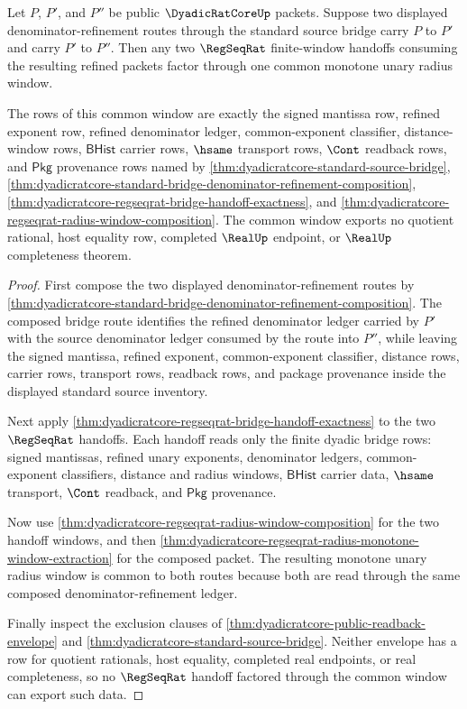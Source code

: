 \begin{theorem}
\label{thm:dyadicratcore-directed-refinement-common-window}
Let $P$, $P'$, and $P''$ be public $\DyadicRatCoreUp$ packets. Suppose two displayed denominator-refinement routes through the standard source bridge carry $P$ to $P'$ and carry $P'$ to $P''$. Then any two $\RegSeqRat$ finite-window handoffs consuming the resulting refined packets factor through one common monotone unary radius window.

The rows of this common window are exactly the signed mantissa row, refined exponent row, refined denominator ledger, common-exponent classifier, distance-window rows, $\mathsf{BHist}$ carrier rows, $\hsame$ transport rows, $\Cont$ readback rows, and $\mathsf{Pkg}$ provenance rows named by \autoref{thm:dyadicratcore-standard-source-bridge}, \autoref{thm:dyadicratcore-standard-bridge-denominator-refinement-composition}, \autoref{thm:dyadicratcore-regseqrat-bridge-handoff-exactness}, and \autoref{thm:dyadicratcore-regseqrat-radius-window-composition}. The common window exports no quotient rational, host equality row, completed $\RealUp$ endpoint, or $\RealUp$ completeness theorem.
\end{theorem}
\begin{proof}
First compose the two displayed denominator-refinement routes by
\autoref{thm:dyadicratcore-standard-bridge-denominator-refinement-composition}.
The composed bridge route identifies the refined denominator ledger carried by
$P'$ with the source denominator ledger consumed by the route into $P''$, while
leaving the signed mantissa, refined exponent, common-exponent classifier,
distance rows, carrier rows, transport rows, readback rows, and package
provenance inside the displayed standard source inventory.

Next apply \autoref{thm:dyadicratcore-regseqrat-bridge-handoff-exactness} to the
two $\RegSeqRat$ handoffs. Each handoff reads only the finite dyadic bridge
rows: signed mantissas, refined unary exponents, denominator ledgers,
common-exponent classifiers, distance and radius windows, $\mathsf{BHist}$
carrier data, $\hsame$ transport, $\Cont$ readback, and $\mathsf{Pkg}$
provenance.

Now use \autoref{thm:dyadicratcore-regseqrat-radius-window-composition} for the
two handoff windows, and then
\autoref{thm:dyadicratcore-regseqrat-radius-monotone-window-extraction} for the
composed packet. The resulting monotone unary radius window is common to both
routes because both are read through the same composed denominator-refinement
ledger.

Finally inspect the exclusion clauses of
\autoref{thm:dyadicratcore-public-readback-envelope} and
\autoref{thm:dyadicratcore-standard-source-bridge}. Neither envelope has a row
for quotient rationals, host equality, completed real endpoints, or real
completeness, so no $\RegSeqRat$ handoff factored through the common window can
export such data.
\end{proof}

